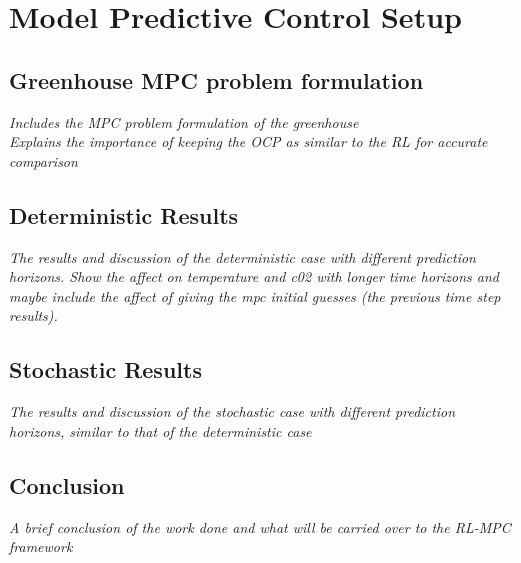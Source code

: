 \chapter{Model Predictive Control Setup}
\label{chapter:MPC}


\section{Greenhouse MPC problem formulation}
\emph{Includes the MPC problem formulation of the greenhouse \\ Explains the importance of keeping the OCP as similar to the RL for accurate comparison}

\section{Deterministic Results}
\emph{The results and discussion of the deterministic case with different prediction horizons. Show the affect on temperature and c02 with longer time horizons and maybe include the affect of giving the mpc initial guesses (the previous time step results).}

\section{Stochastic Results}
\emph{The results and discussion of the stochastic case with different prediction horizons, similar to that of the deterministic case}


\section{Conclusion}
\emph{A brief conclusion of the work done and what will be carried over to the RL-MPC framework}